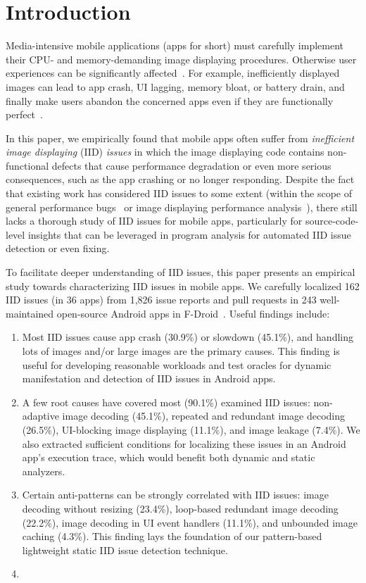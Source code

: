 \section{Introduction}

Media-intensive mobile applications (apps for short) must carefully implement their CPU- and memory-demanding image displaying procedures.
Otherwise user experiences can be significantly affected~\cite{handle_image}.
For example, inefficiently displayed images can lead to app crash, UI lagging, memory bloat, or battery drain,
and finally make users abandon the concerned apps even if they are functionally perfect~\cite{performance}.

In this paper, we empirically found that mobile apps often suffer from
\emph{inefficient image displaying} (IID) \emph{issues}
in which the image displaying code contains non-functional defects that cause performance degradation or even more serious consequences, such as the app crashing or no longer responding.
Despite the fact that existing work has considered IID issues to some extent
(within the scope of general performance bugs~\cite{liu2014characterizing,carette2017investigating, wang2016profiling, linares2015developers, Liu:SW15} or image displaying performance analysis~\cite{kwon2013mantis,gao2017every}),
there still lacks a thorough study of IID issues for mobile apps,
particularly for source-code-level insights that can be leveraged in program analysis for automated IID issue detection or even fixing.

To facilitate deeper understanding of IID issues,
this paper presents an empirical study towards characterizing IID issues in mobile apps.
We carefully localized 162 IID issues (in 36 apps) from 1,826 issue reports and pull requests in 243 well-maintained open-source Android apps in F-Droid~\cite{f-droid}. Useful findings include:

\begin{enumerate}
  \item Most IID issues cause app crash (30.9\%) or slowdown (45.1\%), and handling lots of images and/or large images are the primary causes.
  This finding is useful for developing reasonable workloads and test oracles for dynamic manifestation and detection of IID issues in Android apps.
  \item A few root causes have covered most (90.1\%) examined IID issues: non-adaptive image decoding (45.1\%), repeated and redundant image decoding (26.5\%), UI-blocking image displaying (11.1\%), and image leakage (7.4\%). We also extracted sufficient conditions for localizing these issues in an Android app's execution trace, which would benefit both dynamic and static analyzers.
  \item Certain anti-patterns can be strongly correlated with IID issues: image decoding without resizing (23.4\%), loop-based redundant image decoding (22.2\%), image decoding in UI event handlers (11.1\%), and unbounded image caching (4.3\%).
  This finding lays the foundation of our pattern-based lightweight static IID issue detection technique.
  \item {}
\end{enumerate}

